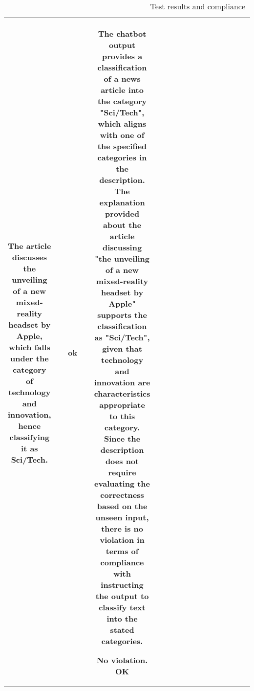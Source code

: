 \begin{table}[h!]
\begin{tabular}{|c|c|c|c|c|c|c|c|c|c|c|}
The article discusses the unveiling of a new mixed-reality headset by Apple, which falls under the category of technology and innovation, hence classifying it as Sci/Tech. & ok & The chatbot output provides a classification of a news article into the category "Sci/Tech", which aligns with one of the specified categories in the description. The explanation provided about the article discussing "the unveiling of a new mixed-reality headset by Apple" supports the classification as "Sci/Tech", given that technology and innovation are characteristics appropriate to this category. Since the description does not require evaluating the correctness based on the unseen input, there is no violation in terms of compliance with instructing the output to classify text into the stated categories.

No violation.
OK\\
\hline
97784ee & 07a923a & NaN &  & 1 & gemma2:9b &  & text: "Apple unveils new mixed reality headset at annual developer conference" & This article belongs to the **Sci/Tech** category. 

Here's why:

* **Focus on technology:** The article discusses a new mixed reality headset, a cutting-edge technological product.
* **Context of a developer conference:** Apple's developer conferences are primarily focused on showcasing new technologies and software to developers.



Let me know if you have any other articles you'd like classified! 
 & ok & The chatbot's output complies with the given description. It classifies the input text into one of the specified categories, Sci/Tech, which matches one of the prescribed categories (World, Sports, Business, Sci/Tech) in the description. The output includes reasoning that illustrates the focus on technology, which aligns with the Sci/Tech category. There is no rule mentioned in the description that the chatbot violated within this output. The suggestion to classify other articles does not violate any described rules either.

OK
  \end{tabular}
  \caption{Test results and compliance}
  
  \end{table}
  
